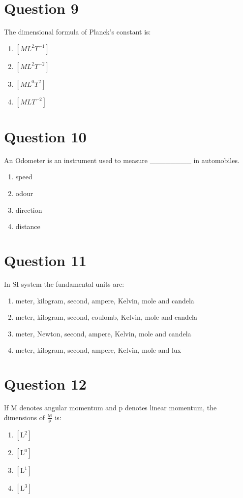 \documentclass{article}
\begin{document}
\section*{Question 9}
The dimensional formula of Planck's constant is:
\begin{enumerate}[label=(\alph*)]
\item \(\left[M L^{2} T^{-1}\right]\)
\item \(\left[M L^{2} T^{-2}\right]\)
\item \(\left[M L^{0} T^{2}\right]\)
\item \(\left[M L T^{-2}\right]\)
\end{enumerate}
\newpage
\section*{Question 10}
An Odometer is an instrument used to measure ________ in automobiles.
\begin{enumerate}[label=(\alph*)]
\item speed
\item odour
\item direction
\item distance
\end{enumerate}
\newpage
\section*{Question 11}
In SI system the fundamental units are:
\begin{enumerate}[label=(\alph*)]
\item meter, kilogram, second, ampere, Kelvin, mole and candela
\item meter, kilogram, second, coulomb, Kelvin, mole and candela
\item meter, Newton, second, ampere, Kelvin, mole and candela
\item meter, kilogram, second, ampere, Kelvin, mole and lux
\end{enumerate}
\newpage
\section*{Question 12}
If \(\mathrm{M}\) denotes angular momentum and \(\mathrm{p}\) denotes linear momentum, the dimensions of \(\frac{\mathrm M}{\mathrm p}\) is:
\begin{enumerate}[label=(\alph*)]
\item \([\mathrm L^2]\)
\item \([\mathrm L^0]\)
\item \([\mathrm L^1]\)
\item \([\mathrm L^3]\)
\end{enumerate}
\newpage
\end{document}
